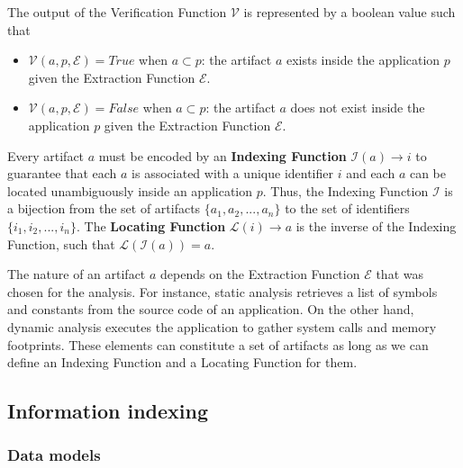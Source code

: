 The output of the Verification Function $\mathcal{V}$ is represented by a boolean value such that

\begin{itemize}
	\item $\mathcal{V}(\mathit{a}, \mathit{p}, \mathcal{E}) = True$ when $\mathit{a} \subset \mathit{p}$: the artifact $\mathit{a}$ exists inside the application $\mathit{p}$ given the Extraction Function $\mathcal{E}$.
	\item $\mathcal{V}(\mathit{a}, \mathit{p}, \mathcal{E}) = False$ when $\mathit{a} \subset \mathit{p}$: the artifact $\mathit{a}$ does not exist inside the application $\mathit{p}$ given the Extraction Function $\mathcal{E}$.
\end{itemize}

Every artifact $\mathit{a}$ must be encoded by an \textbf{Indexing Function} $\mathcal{I}(\mathit{a}) \rightarrow \mathit{i}$ to guarantee that each $\mathit{a}$ is associated with a unique identifier $\mathit{i}$ and each $\mathit{a}$ can be located unambiguously inside an application $\mathit{p}$.
Thus, the Indexing Function $\mathcal{I}$ is a bijection from the set of artifacts $\{\mathit{a}_1, \mathit{a}_2, ..., \mathit{a}_n\}$ to the set of identifiers $\{\mathit{i}_1, \mathit{i}_2, ..., \mathit{i}_n\}$.
The \textbf{Locating Function} $\mathcal{L}(\mathit{i}) \rightarrow \mathit{a}$ is the inverse of the Indexing Function, such that $\mathcal{L}(\mathcal{I}(\mathit{a})) = \mathit{a}$.

The nature of an artifact $\mathit{a}$ depends on the Extraction Function $\mathcal{E}$ that was chosen for the analysis.
For instance, static analysis retrieves a list of symbols and constants from the source code of an application.
On the other hand, dynamic analysis executes the application to gather system calls and memory footprints.
These elements can constitute a set of artifacts as long as we can define an Indexing Function and a Locating Function for them.
\subsection{Information indexing}
\subsubsection{Data models}

